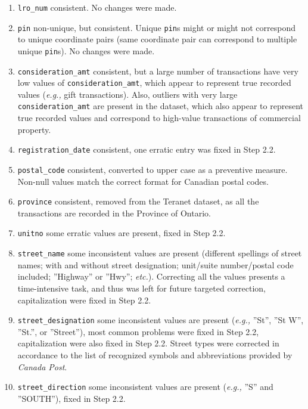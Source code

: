 \documentclass[11pt]{article}
\begin{document}
    \begin{enumerate}
        \item \texttt{lro\_num} \textemdash consistent.
        No changes were made.
        \item \texttt{pin} \textemdash non-unique, but consistent.
        Unique \texttt{pin}s might or might not correspond to unique coordinate pairs (same coordinate pair can correspond to multiple unique \texttt{pin}s).
        No changes were made.
        \item \texttt{consideration\_amt} \textemdash consistent, but a large number of transactions have very low values of \texttt{consideration\_amt}, which appear to represent true recorded values (\textit{e.g.,} gift transactions).
        Also, outliers with very large \texttt{consideration\_amt} are present in the dataset, which also appear to represent true recorded values and correspond to high-value transactions of commercial property.
        \item \texttt{registration\_date} \textemdash consistent, one erratic entry was fixed in Step 2.2.
        \item \texttt{postal\_code} \textemdash consistent, converted to upper case as a preventive measure.
        Non-null values match the correct format for Canadian postal codes.
        \item \texttt{province} \textemdash consistent, removed from the Teranet dataset, as all the transactions are recorded in the Province of Ontario.
        \item \texttt{unitno} \textemdash some erratic values are present, fixed in Step 2.2.
        \item \texttt{street\_name} \textemdash some inconsistent values are present (different spellings of street names;
        with and without street designation;
        unit/suite number/postal code included;
        ''Highway'' or ''Hwy''; \textit{etc.}).
        Correcting all the values presents a time-intensive task, and thus was left for future targeted correction, capitalization were fixed in Step 2.2.
        \item \texttt{street\_designation} \textemdash some inconsistent values are present (\textit{e.g.,} ''St'', ''St W'', ''St.'', or ''Street''), most common problems were fixed in Step 2.2, capitalization were also fixed in Step 2.2.
        Street types were corrected in accordance to the list of recognized symbols and abbreviations provided by \textit{Canada Post}\cite{CanadaPost2019}.
        \item \texttt{street\_direction} \textemdash some inconsistent values are present (\textit{e.g.,} ''S'' and ''SOUTH''), fixed in Step 2.2.

\end{enumerate}
\end{document}
